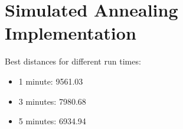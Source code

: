 \documentclass[a4paper, 12pt]{article}
\begin{document}
\section{Simulated Annealing Implementation}

Best distances for different run times:
\begin{itemize}
	\item 1 minute: 9561.03
    \item 3 minutes: 7980.68
    \item 5 minutes: 6934.94
\end{itemize}
\end{document}
